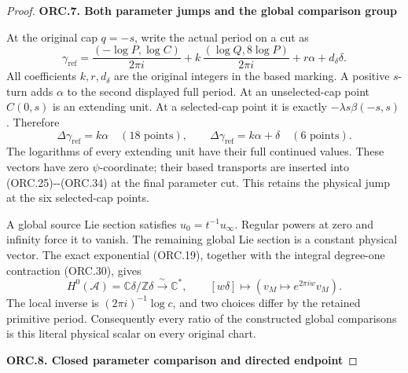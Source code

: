 \begin{proof}
\par

\medskip\noindent\textbf{ORC.7. Both parameter jumps and the global comparison group}

\par\nobreak

At the original cap \(q=-s\), write the actual period on a cut as
\[
\gamma_{\mathrm{ref}}=
\frac{(-\log P,\log C)}{2\pi i}
+k\,\frac{(\log Q,8\log P)}{2\pi i}
+r\alpha+d_\delta\delta .
\tag{ORC.35}
\]
All coefficients \(k,r,d_\delta\) are the original integers
in the based marking. A positive \(s\)-turn adds \(\alpha\)
to the second displayed full period. At an unselected-cap
point \(C(0,s)\) is an extending unit. At a selected-cap
point it is exactly \(-\lambda s\beta(-s,s)\). Therefore
\[
\Delta\gamma_{\mathrm{ref}}=k\alpha
\quad(18\text{ points}),\qquad
\Delta\gamma_{\mathrm{ref}}=k\alpha+\delta
\quad(6\text{ points}).
\tag{ORC.36}
\]
The logarithms of every extending unit have their full
continued values. These vectors have zero \(\psi\)-coordinate;
their based transports are inserted into (ORC.25)-\/-(ORC.34)
at the final parameter cut. This retains the physical jump
at the six selected-cap points.

A global source Lie section satisfies \(u_0=t^{-1}u_\infty\).
Regular powers at zero and infinity force it to vanish.
The remaining global Lie section is a constant physical
vector. The exact exponential (ORC.19), together with the
integral degree-one contraction (ORC.30), gives
\[
H^0(\mathscr A)=\mathbb C\delta/\mathbb Z\delta
 \xrightarrow{\ \sim\ }\mathbb C^*,\qquad
[w\delta]\longmapsto(v_M\mapsto e^{2\pi iw}v_M).
\tag{ORC.37}
\]
The local inverse is \((2\pi i)^{-1}\log c\), and two
choices differ by the retained primitive period.
Consequently every ratio of the constructed global
comparisons is this literal physical scalar on every
original chart.

\par

\medskip\noindent\textbf{ORC.8. Closed parameter comparison and directed endpoint}

\par\nobreak


\end{proof}
